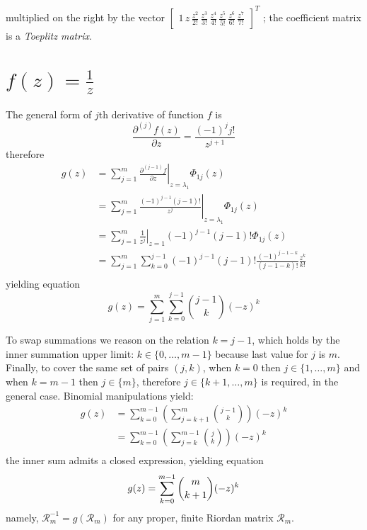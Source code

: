 multiplied on the right by the vector $\left[\begin{matrix}1\,z\,\frac{z^{2}}{2!}\,\frac{z^{3}}{3!}\,\frac{z^{4}}{4!}\,\frac{z^{5}}{5!}\,\frac{z^{6}}{6!}\,\frac{z^{7}}{7!}\end{matrix}\right]^{T}$
; the coefficient matrix is a \emph{Toeplitz matrix}.


\section{$f(z)=\frac{1}{z}$}

The general form of $j$th derivative of function $f$ is 
$$\frac{\partial^{(j)}{f}(z)}{\partial{z}} = \frac{(-1)^{j}j!}{z^{j+1}}$$ 
therefore
\begin{displaymath}
\begin{split}
  g(z) &= \sum_{j=1}^{m}{ \left. \frac{\partial^{(j-1)}{f}}{\partial{z}} \right|_{z=\lambda_{1}}\Phi_{1j}(z)} \\
       &= \sum_{j=1}^{m}{ \left. \frac{(-1)^{j-1}(j-1)!}{z^{j}} \right|_{z=\lambda_{1}}\Phi_{1j}(z)} \\
       &= \sum_{j=1}^{m}{ \left. \frac{1}{z^{j}} \right|_{z=1}(-1)^{j-1}(j-1)!\Phi_{1j}(z)} \\
       &= \sum_{j=1}^{m}{\sum_{k=0}^{j-1}{(-1)^{j-1}(j-1)!\frac{(-1)^{j-1-k}}{(j-1-k)!}\frac{z^{k}}{k!}}} \\
\end{split}
\end{displaymath}
yielding equation
\begin{equation}
  g(z) = \sum_{j=1}^{m}{\sum_{k=0}^{j-1}{{{j-1}\choose{k}}(-z)^{k}}} 
\end{equation}

To swap summations we reason on the relation $k=j-1$, which holds by the inner summation upper limit:
$k\in \lbrace 0,\ldots,m-1 \rbrace$ because last value for $j$ is $m$. Finally, to cover the same set 
of pairs $(j, k)$, when $k=0$ then $j\in \lbrace 1,\ldots,m \rbrace$ and when $k=m-1$ then 
$j\in \lbrace m \rbrace$, therefore $j\in \lbrace k+1, \ldots, m \rbrace$ is required, in the general case.
Binomial manipulations yield:
\begin{displaymath}
\begin{split}
  g(z) &= \sum_{k=0}^{m-1}{\left(\sum_{j=k+1}^{m}{{{j-1}\choose{k}}}\right)(-z)^{k}} \\
       &= \sum_{k=0}^{m-1}{\left(\sum_{j=k}^{m-1}{{{j}\choose{k}}}\right)(-z)^{k}} \\
\end{split}
\end{displaymath}
the inner sum admits a closed expression, yielding equation
\begin{equation}
  g(z) = \sum_{k=0}^{m-1}{{{m}\choose{k+1}}(-z)^{k}} \\
\end{equation}
namely, $\mathcal{R}_{m}^{-1}=g(\mathcal{R}_{m})$ for any proper, finite Riordan matrix $\mathcal{R}_{m}$.

